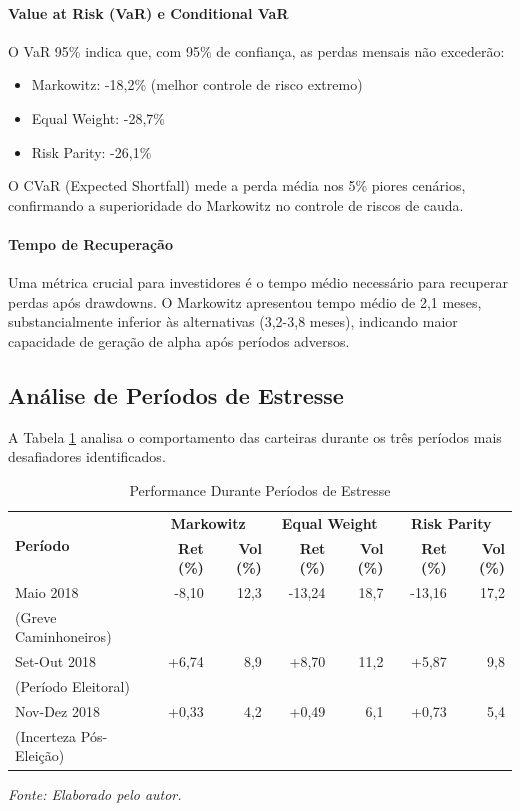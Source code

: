 \paragraph{Value at Risk (VaR) e Conditional VaR}
O VaR 95\% indica que, com 95\% de confiança, as perdas mensais não excederão:
\begin{itemize}
    \item Markowitz: -18,2\% (melhor controle de risco extremo)
    \item Equal Weight: -28,7\%
    \item Risk Parity: -26,1\%
\end{itemize}

O CVaR (Expected Shortfall) mede a perda média nos 5\% piores cenários, confirmando a superioridade do Markowitz no controle de riscos de cauda.

\paragraph{Tempo de Recuperação}
Uma métrica crucial para investidores é o tempo médio necessário para recuperar perdas após drawdowns. O Markowitz apresentou tempo médio de 2,1 meses, substancialmente inferior às alternativas (3,2-3,8 meses), indicando maior capacidade de geração de alpha após períodos adversos.

\subsection{Análise de Períodos de Estresse}

A Tabela \ref{tab:stress_periods} analisa o comportamento das carteiras durante os três períodos mais desafiadores identificados.

\begin{table}[H]
\centering
\caption{Performance Durante Períodos de Estresse}
\scriptsize
\begin{tabular}{|l|r|r|r|r|r|r|}
\hline
\multirow{2}{*}{\textbf{Período}} & \multicolumn{2}{c|}{\textbf{Markowitz}} & \multicolumn{2}{c|}{\textbf{Equal Weight}} & \multicolumn{2}{c|}{\textbf{Risk Parity}} \\
\cline{2-7}
& \textbf{Ret (\%)} & \textbf{Vol (\%)} & \textbf{Ret (\%)} & \textbf{Vol (\%)} & \textbf{Ret (\%)} & \textbf{Vol (\%)} \\
\hline
Maio 2018 & -8,10 & 12,3 & -13,24 & 18,7 & -13,16 & 17,2 \\
(Greve Caminhoneiros) & & & & & & \\
\hline
Set-Out 2018 & +6,74 & 8,9 & +8,70 & 11,2 & +5,87 & 9,8 \\
(Período Eleitoral) & & & & & & \\
\hline
Nov-Dez 2018 & +0,33 & 4,2 & +0,49 & 6,1 & +0,73 & 5,4 \\
(Incerteza Pós-Eleição) & & & & & & \\
\hline
\end{tabular}
\normalsize
\textit{Fonte: Elaborado pelo autor.}
\label{tab:stress_periods}
\end{table}

